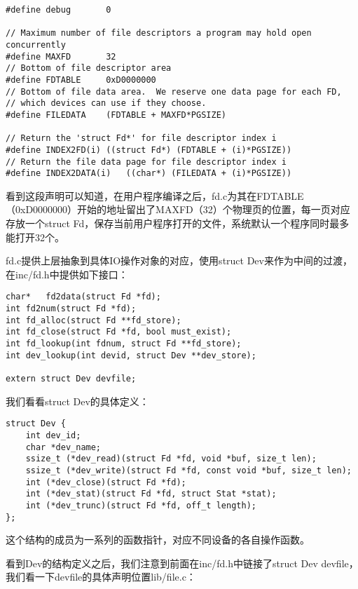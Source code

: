 \documentclass{article}
\begin{document}
\begin{CJK*}{UTF8}{gkai}
\begin{lstlisting}[style=ccode, title={\scriptsize \ttfamily \bfseries lib/fd.c}]
#define debug		0

// Maximum number of file descriptors a program may hold open concurrently
#define MAXFD		32
// Bottom of file descriptor area
#define FDTABLE		0xD0000000
// Bottom of file data area.  We reserve one data page for each FD,
// which devices can use if they choose.
#define FILEDATA	(FDTABLE + MAXFD*PGSIZE)

// Return the 'struct Fd*' for file descriptor index i
#define INDEX2FD(i)	((struct Fd*) (FDTABLE + (i)*PGSIZE))
// Return the file data page for file descriptor index i
#define INDEX2DATA(i)	((char*) (FILEDATA + (i)*PGSIZE))
\end{lstlisting}

看到这段声明可以知道，在用户程序编译之后，fd.c为其在FDTABLE（0xD0000000）开始的地址留出了MAXFD（32）个物理页的位置，每一页对应存放一个struct Fd，保存当前用户程序打开的文件，系统默认一个程序同时最多能打开32个。

fd.c提供上层抽象到具体IO操作对象的对应，使用struct Dev来作为中间的过渡，在inc/fd.h中提供如下接口：

\begin{lstlisting}[style=ccode, firstnumber=47, title={\scriptsize \ttfamily \bfseries inc/fd.h}]
char*	fd2data(struct Fd *fd);
int	fd2num(struct Fd *fd);
int	fd_alloc(struct Fd **fd_store);
int	fd_close(struct Fd *fd, bool must_exist);
int	fd_lookup(int fdnum, struct Fd **fd_store);
int	dev_lookup(int devid, struct Dev **dev_store);

extern struct Dev devfile;
\end{lstlisting}

我们看看struct Dev的具体定义：

\begin{lstlisting}[style=ccode, firstnumber=16, title={\scriptsize \ttfamily \bfseries inc/fd.h}]
struct Dev {
	int dev_id;
	char *dev_name;
	ssize_t (*dev_read)(struct Fd *fd, void *buf, size_t len);
	ssize_t (*dev_write)(struct Fd *fd, const void *buf, size_t len);
	int (*dev_close)(struct Fd *fd);
	int (*dev_stat)(struct Fd *fd, struct Stat *stat);
	int (*dev_trunc)(struct Fd *fd, off_t length);
};
\end{lstlisting}

这个结构的成员为一系列的函数指针，对应不同设备的各自操作函数。

看到Dev的结构定义之后，我们注意到前面在inc/fd.h中链接了struct Dev devfile，我们看一下devfile的具体声明位置lib/file.c：

\begin{lstlisting}[style=ccode, title={\scriptsize \ttfamily \bfseries lib/file.c}]


\end{lstlisting}
\end{CJK*}
\end{document}
